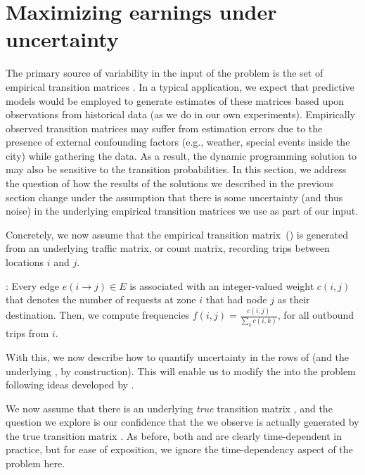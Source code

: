 

\section{Maximizing earnings under uncertainty}
\label{sec:sensitivity}
The primary source of variability in the input of the {\originalproblem} problem
is the set of empirical transition matrices {\empiricaltransitionmatrix}.  In a typical application,
we expect that predictive models would be employed to generate estimates of these matrices based upon observations
from historical data (as we do in our own experiments).  Empirically observed transition matrices may 
suffer from estimation errors due to the presence of external confounding factors (e.g., 
weather, special 
events inside the city) while gathering the data. As a result, the dynamic programming solution 
to {\originalproblem}  may also be sensitive to the transition probabilities. In this section, 
we address the question of how the results of the solutions we described in the previous section change 
under the assumption that there is some uncertainty (and thus noise) in the underlying empirical transition 
matrices we use as part of our input.

Concretely, we now assume that the empirical transition matrix~(\empiricaltransitionmatrix)  is generated from an 
underlying traffic matrix, or count matrix, recording trips between locations $i$ and $j$.

:
Every edge $e(i\rightarrow j) \in E$ is associated with an
integer-valued weight $c(i,j)$ that denotes the number of requests
at zone $i$ that had node $j$ as their destination.
Then, we compute frequencies $f(i,j) = \frac{c(i,j)}{\sum_k c(i,k)}$, for all outbound trips from $i$.

With this, we now describe how to quantify uncertainty in the rows of {\empiricaltransitionmatrix} 
(and the underlying {\countmatrix}, by construction). This will enable us to  
modify the {\originalproblem} into the {\robustproblem} problem following ideas developed
by \citet{nilim2004robustness}.



We now assume that there is an underlying \emph{true} transition matrix
{\truetransitionmatrix}, and the question we explore is 
our confidence that the
{\countmatrix} we observe is actually 
generated by the true transition matrix {\truetransitionmatrix}.  As before, both 
{\truetransitionmatrix} and {\countmatrix} are clearly time-dependent in practice,
but for ease of exposition, we ignore the time-dependency aspect of the problem here.

